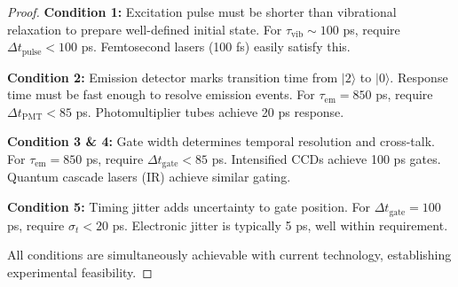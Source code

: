 \documentclass[twocolumn,10pt]{article}
\begin{document}
\begin{proof}
\textbf{Condition 1:} Excitation pulse must be shorter than vibrational relaxation to prepare well-defined initial state. For $\tau_{\text{vib}} \sim 100$ ps, require $\Delta t_{\text{pulse}} < 100$ ps. Femtosecond lasers (100 fs) easily satisfy this.

\textbf{Condition 2:} Emission detector marks transition time from $|2\rangle$ to $|0\rangle$. Response time must be fast enough to resolve emission events. For $\tau_{\text{em}} = 850$ ps, require $\Delta t_{\text{PMT}} < 85$ ps. Photomultiplier tubes achieve 20 ps response.

\textbf{Condition 3 \& 4:} Gate width determines temporal resolution and cross-talk. For $\tau_{\text{em}} = 850$ ps, require $\Delta t_{\text{gate}} < 85$ ps. Intensified CCDs achieve 100 ps gates. Quantum cascade lasers (IR) achieve similar gating.

\textbf{Condition 5:} Timing jitter adds uncertainty to gate position. For $\Delta t_{\text{gate}} = 100$ ps, require $\sigma_t < 20$ ps. Electronic jitter is typically 5 ps, well within requirement.

All conditions are simultaneously achievable with current technology, establishing experimental feasibility.
\end{proof}
\end{document}
